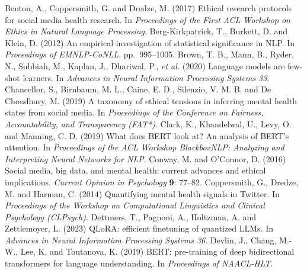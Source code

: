 \begin{thebibliography}{}
 Benton, A., Coppersmith, G. and Dredze, M. (2017) Ethical research protocols for social media health
 research. In {\it Proceedings of the First ACL Workshop on Ethics in Natural Language Processing}.
 Berg-Kirkpatrick, T., Burkett, D. and Klein, D. (2012) An empirical investigation of statistical
 significance in NLP. In {\it Proceedings of EMNLP-CoNLL}, pp.~995--1005.
 Brown, T. B., Mann, B., Ryder, N., Subbiah, M., Kaplan, J., Dhariwal, P., {\it et al.} (2020)
 Language models are few-shot learners. In {\it Advances in Neural Information Processing Systems 33}.
 Chancellor, S., Birnbaum, M. L., Caine, E. D., Silenzio, V. M. B. and De Choudhury, M. (2019)
 A taxonomy of ethical tensions in inferring mental health states from social media. In
 {\it Proceedings of the Conference on Fairness, Accountability, and Transparency (FAT*)}.
 Clark, K., Khandelwal, U., Levy, O. and Manning, C. D. (2019) What does BERT look at? An analysis of
 BERT's attention. In {\it Proceedings of the ACL Workshop BlackboxNLP: Analyzing and Interpreting
 Neural Networks for NLP}.
 Conway, M. and O'Connor, D. (2016) Social media, big data, and mental health: current advances and
 ethical implications. {\it Current Opinion in Psychology} {\bf 9}: 77--82.
 Coppersmith, G., Dredze, M. and Harman, C. (2014) Quantifying mental health signals in Twitter. In
 {\it Proceedings of the Workshop on Computational Linguistics and Clinical Psychology (CLPsych)}.
 Dettmers, T., Pagnoni, A., Holtzman, A. and Zettlemoyer, L. (2023) QLoRA: efficient finetuning of
 quantized LLMs. In {\it Advances in Neural Information Processing Systems 36}.
 Devlin, J., Chang, M.-W., Lee, K. and Toutanova, K. (2019) BERT: pre-training of deep bidirectional
 transformers for language understanding. In {\it Proceedings of NAACL-HLT}.

\end{thebibliography}
